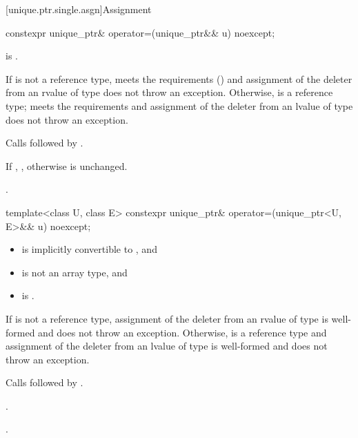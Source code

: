 [unique.ptr.single.asgn]{Assignment}

%
\begin{itemdecl}
constexpr unique_ptr& operator=(unique_ptr&& u) noexcept;
\end{itemdecl}

\begin{itemdescr}
\pnum
\constraints
{} is .

\pnum
\expects
If  is not a reference type,  meets the
 requirements () and assignment
of the deleter from an rvalue of type  does not throw an exception.
Otherwise,  is a reference type;
 meets the 
requirements and assignment of the deleter from an
lvalue of type  does not throw an exception.

\pnum
\effects
Calls  followed by
.

\pnum
\ensures
If ,
,
otherwise  is unchanged.

\pnum
\returns
{}.
\end{itemdescr}

%
\begin{itemdecl}
template<class U, class E> constexpr unique_ptr& operator=(unique_ptr<U, E>&& u) noexcept;
\end{itemdecl}

\begin{itemdescr}
\pnum
\constraints
\begin{itemize}
\item {} is implicitly convertible to , and
\item {} is not an array type, and
\item {} is .
\end{itemize}

\pnum
\expects
If  is not a reference type,
assignment of the deleter from an rvalue of type 
is well-formed and does not throw an exception.
Otherwise,  is a reference type and
assignment of the deleter from an lvalue of type 
is well-formed and does not throw an exception.

\pnum
\effects
Calls  followed by
.

\pnum
\ensures
{}.

\pnum
\returns
{}.
\end{itemdescr}

